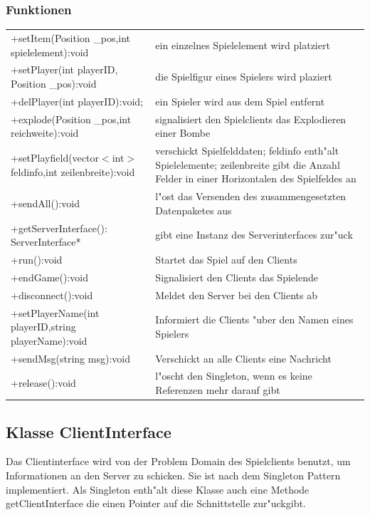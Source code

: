 \subsubsection{Funktionen}
\begin{tabular}{p{50mm}p{90mm}}
+setItem(Position \_pos,int spielelement):void 		 &ein einzelnes Spielelement wird platziert\\
+setPlayer(int playerID, Position \_pos):void 		 &die Spielfigur eines Spielers wird plaziert\\
+delPlayer(int playerID):void;				 &ein Spieler wird aus dem Spiel entfernt\\
+explode(Position \_pos,int reichweite):void		 &signalisiert den Spielclients das Explodieren einer Bombe\\
+setPlayfield(vector$<$int$>$ feldinfo,int zeilenbreite):void&verschickt Spielfelddaten; feldinfo enth"alt Spielelemente;
							  zeilenbreite gibt die Anzahl Felder in einer Horizontalen
							  des Spielfeldes an\\
+sendAll():void 				 	 &l"ost das Versenden des zusammengesetzten Datenpaketes aus\\
+getServerInterface(): ServerInterface*		         &gibt eine Instanz des Serverinterfaces zur"uck\\
+run():void &Startet das Spiel auf den Clients\\
+endGame():void &Signalisiert den Clients das Spielende\\
+disconnect():void&Meldet den Server bei den Clients ab\\
+setPlayerName(int playerID,string playerName):void&Informiert die Clients "uber den Namen eines Spielers\\
+sendMsg(string msg):void&Verschickt an alle Clients eine Nachricht\\
+release():void&l"oscht den Singleton, wenn es keine Referenzen mehr darauf gibt\\
\end{tabular}

\subsection{Klasse ClientInterface}
Das Clientinterface wird von der Problem Domain des Spielclients benutzt, um
Informationen an den Server zu schicken. Sie ist nach dem Singleton Pattern
implementiert.
Als Singleton enth"alt diese Klasse auch eine Methode getClientInterface die einen Pointer
auf die Schnittstelle zur"uckgibt.

